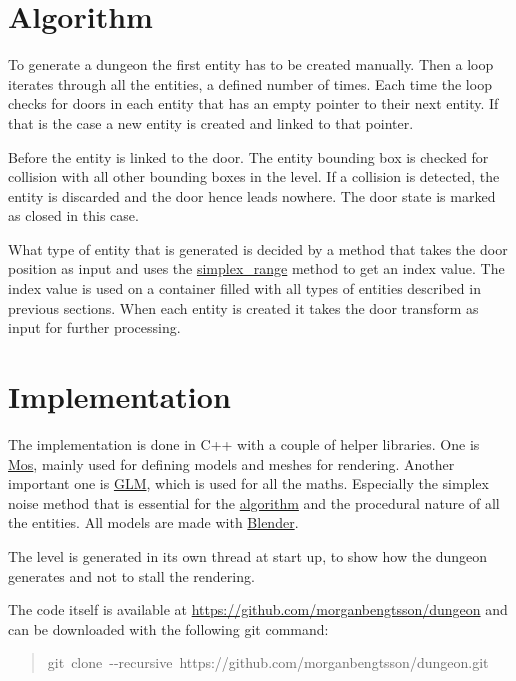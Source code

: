 \documentclass[a4paper]{article}
\begin{document}
\section{Algorithm%
  \label{algorithm}%
}

To generate a dungeon the first entity has to be created manually. Then a loop iterates through all the entities, a defined number of times. Each time the loop checks for doors in each entity that has an empty pointer to their next entity. If that is the case a new entity is created and linked to that pointer.

Before the entity is linked to the door. The entity bounding box is checked for collision with all other bounding boxes in the level. If a collision is detected, the entity is discarded and the door hence leads nowhere. The door state is marked as closed in this case.

What type of entity that is generated is decided by a method that takes the door position as input and uses the \hyperref[simplex-range]{simplex\_range} method to get an index value. The index value is used on a container filled with all types of entities described in previous sections. When each entity is created it takes the door transform as input for further processing.


\section{Implementation%
  \label{implementation}%
}

The implementation is done in C++ with a couple of helper libraries. One is \href{https://github.com/morganbengtsson/mos}{Mos}, mainly used for defining models and meshes for rendering. Another important one is \href{http://glm.g-truc.net/0.9.8/index.html}{GLM}, which is used for all the maths. Especially the simplex noise method that is essential for the \hyperref[algorithm]{algorithm} and the procedural nature of all the entities. All models are made with \href{https://www.blender.org/}{Blender}.

The level is generated in its own thread at start up, to show how the dungeon generates and not to stall the rendering.

The code itself is available at \url{https://github.com/morganbengtsson/dungeon} and can be downloaded with the following git command:
%
\begin{quote}{\ttfamily \raggedright \noindent
git~clone~-{}-recursive~https://github.com/morganbengtsson/dungeon.git
}
\end{quote}
\end{document}
